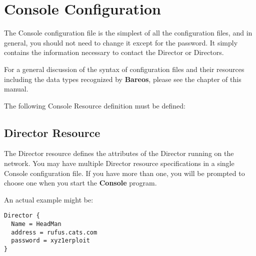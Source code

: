 
\chapter{Console Configuration}
\label{ConsoleConfChapter}

The Console configuration file is the simplest of all the configuration files,
and in general, you should not need to change it except for the password. It
simply contains the information necessary to contact the Director or
Directors.

For a general discussion of the syntax of configuration files and their
resources including the data types recognized by {\bf Bareos}, please see
the  chapter of this manual.

The following Console Resource definition must be defined:

\section{Director Resource}
\label{DirectorResource3}

The Director resource defines the attributes of the Director running on the
network. You may have multiple Director resource specifications in a single
Console configuration file. If you have more than one, you will be prompted to
choose one when you start the {\bf Console} program.





An actual example might be:

\footnotesize
\begin{verbatim}
Director {
  Name = HeadMan
  address = rufus.cats.com
  password = xyz1erploit
}
\end{verbatim}
\normalsize

